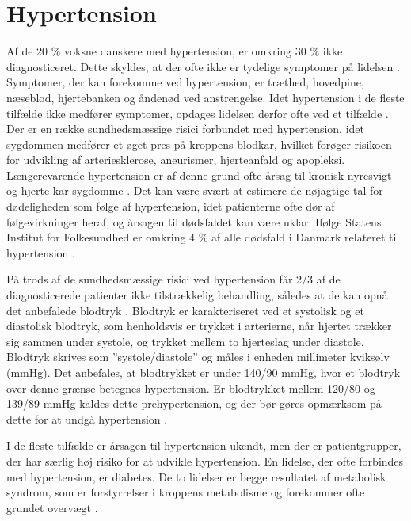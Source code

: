 \section{Hypertension}

Af de 20 \% voksne danskere med hypertension, er omkring 30 \% ikke diagnosticeret. Dette skyldes, at der ofte ikke er tydelige symptomer på lidelsen \cite{kronborg2008}. Symptomer, der kan forekomme ved hypertension, er træthed, hovedpine, næseblod, hjertebanken og åndenød ved anstrengelse. Idet hypertension i de fleste tilfælde ikke medfører symptomer, opdages lidelsen derfor ofte ved et tilfælde \cite{olsen2015}.
Der er en række sundhedsmæssige risici forbundet med hypertension, idet sygdommen medfører et øget pres på kroppens blodkar, hvilket forøger risikoen for udvikling af arteriesklerose, aneurismer, hjerteanfald og apopleksi. Længerevarende hypertension er af denne grund ofte årsag til kronisk nyresvigt og hjerte-kar-sygdomme \cite{martini2015}. Det kan være svært at estimere de nøjagtige tal for dødeligheden som følge af hypertension, idet patienterne ofte dør af følgevirkninger heraf, og årsagen til dødsfaldet kan være uklar. Ifølge Statens Institut for Folkesundhed er omkring 4 \% af alle dødsfald i Danmark relateret til hypertension \cite{juel2006}.
 
På trods af de sundhedsmæssige risici ved hypertension får 2/3 af de diagnosticerede patienter ikke tilstrækkelig behandling, således at de kan opnå det anbefalede blodtryk \cite{paulsen2012}.
Blodtryk er karakteriseret ved et systolisk og et diastolisk blodtryk, som henholdsvis er trykket i arterierne, når hjertet trækker sig sammen under systole, og trykket mellem to hjerteslag under diastole. Blodtryk skrives som ”systole/diastole” og måles i enheden millimeter kviksølv (mmHg). Det anbefales, at blodtrykket er under 140/90 mmHg, hvor et blodtryk over denne grænse betegnes hypertension. Er blodtrykket mellem 120/80 og 139/89 mmHg kaldes dette prehypertension, og der bør gøres opmærksom på dette for at undgå hypertension \cite{martini2015}.

I de fleste tilfælde er årsagen til hypertension ukendt, men der er patientgrupper, der har særlig høj risiko for at udvikle hypertension. En lidelse, der ofte forbindes med hypertension, er diabetes. De to lidelser er begge resultatet af metabolisk syndrom, som er forstyrrelser i kroppens metabolisme og forekommer ofte grundet overvægt \cite{cheung2012}.


